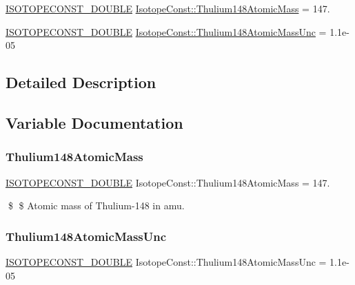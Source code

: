 \begin{DoxyCompactItemize}
\item 
\mbox{\hyperlink{group___isotope_const-_macros_ga8f45a7272ce02c0b4c65c44636ed719a}{I\+S\+O\+T\+O\+P\+E\+C\+O\+N\+S\+T\+\_\+\+D\+O\+U\+B\+LE}} \mbox{\hyperlink{group___isotope_const-_thulium-_tm148_ga02d3c94d96edadd473e172e6f92bdadf}{Isotope\+Const\+::\+Thulium148\+Atomic\+Mass}} = 147.
\item 
\mbox{\hyperlink{group___isotope_const-_macros_ga8f45a7272ce02c0b4c65c44636ed719a}{I\+S\+O\+T\+O\+P\+E\+C\+O\+N\+S\+T\+\_\+\+D\+O\+U\+B\+LE}} \mbox{\hyperlink{group___isotope_const-_thulium-_tm148_gacf93e37de269baaadaa2df09035f7400}{Isotope\+Const\+::\+Thulium148\+Atomic\+Mass\+Unc}} = 1.\+1e-\/05
\end{DoxyCompactItemize}


\subsection{Detailed Description}


\subsection{Variable Documentation}
\mbox{\label{group___isotope_const-_thulium-_tm148_ga02d3c94d96edadd473e172e6f92bdadf}} 
\subsubsection{\texorpdfstring{Thulium148\+Atomic\+Mass}{Thulium148AtomicMass}}
{\footnotesize\ttfamily \mbox{\hyperlink{group___isotope_const-_macros_ga8f45a7272ce02c0b4c65c44636ed719a}{I\+S\+O\+T\+O\+P\+E\+C\+O\+N\+S\+T\+\_\+\+D\+O\+U\+B\+LE}} Isotope\+Const\+::\+Thulium148\+Atomic\+Mass = 147.}

\$ \$ Atomic mass of Thulium-\/148 in amu. \mbox{\label{group___isotope_const-_thulium-_tm148_gacf93e37de269baaadaa2df09035f7400}} 
\subsubsection{\texorpdfstring{Thulium148\+Atomic\+Mass\+Unc}{Thulium148AtomicMassUnc}}
{\footnotesize\ttfamily \mbox{\hyperlink{group___isotope_const-_macros_ga8f45a7272ce02c0b4c65c44636ed719a}{I\+S\+O\+T\+O\+P\+E\+C\+O\+N\+S\+T\+\_\+\+D\+O\+U\+B\+LE}} Isotope\+Const\+::\+Thulium148\+Atomic\+Mass\+Unc = 1.\+1e-\/05}


